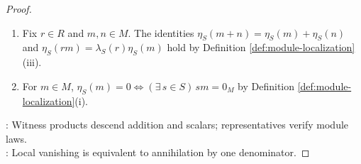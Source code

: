 \begin{proposition}
\begin{proof}
\begin{enumerate}[label=(\roman*)]
Fix $a/q,b/t\in S^{-1}R$ and $m/s,n/u\in S^{-1}M$. Then $((a/q)(b/t))(m/s)=abm/(qts)=(a/q)((b/t)(m/s))$,\\
$((a/q)+(b/t))(m/s)=(tam+qbm)/(qts)=(a/q)(m/s)+(b/t)(m/s)$,\\
$(a/q)(m/s+n/u)=(aum+asn)/(qsu)=(a/q)(m/s)+(a/q)(n/u)$, and $(1_R/1_R)(m/s)=m/s$; $S^{-1}M$ is an $S^{-1}R$-module.
\item Fix $r\in R$ and $m,n\in M$. The identities $\eta_S(m+n)=\eta_S(m)+\eta_S(n)$ and $\eta_S(rm)=\lambda_S(r)\eta_S(m)$ hold by Definition \ref{def:module-localization}(iii).
\item For $m\in M$, $\eta_S(m)=0\Longleftrightarrow(\exists\,s\in S)\,sm=0_M$ by Definition \ref{def:module-localization}(i).
\end{enumerate}
: Witness products descend addition and scalars; representatives verify module laws.\\
: Local vanishing is equivalent to annihilation by one denominator.
\end{proof}
\end{proposition}

